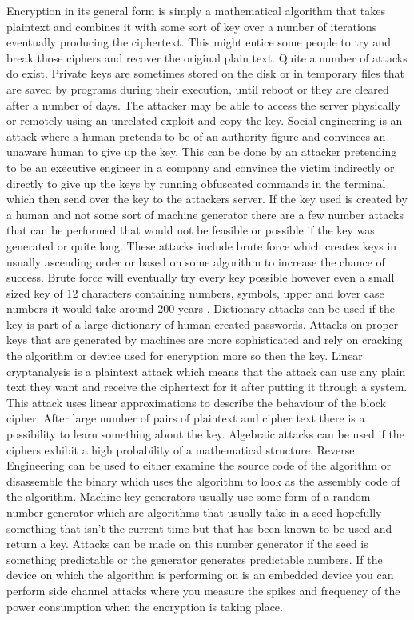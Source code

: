 Encryption in its general form is simply a mathematical algorithm that takes plaintext and combines it with some sort of key over a number of iterations eventually producing the ciphertext. This might entice some people to try and break those ciphers and recover the original plain text. Quite a number of attacks do exist.
Private keys are sometimes stored on the disk or in temporary files that are saved by programs during their execution, until reboot or they are cleared after a number of days. The attacker may be able to access the server physically or remotely using an unrelated exploit and copy the key.
Social engineering is an attack where a human pretends to be of an authority figure and convinces an unaware human to give up the key. This can be done by an attacker pretending to be an executive engineer in a company and convince the victim indirectly or directly to give up the keys by running obfuscated commands in the terminal which then send over the key to the attackers server.
If the key used is created by a human and not some sort of machine generator there are a few number attacks that can be performed that would not be feasible or possible if the key was generated or quite long. These attacks include brute force which creates keys in usually ascending order or based on some algorithm to increase the chance of success. Brute force will eventually try every key possible however even a small sized key of 12 characters containing numbers, symbols, upper and lover case numbers it would take around 200 years \cite{brute}. Dictionary attacks can be used if the key is part of a large dictionary of human created passwords. 
Attacks on proper keys that are generated by machines are more sophisticated and rely on cracking the algorithm or device used for encryption more so then the key.
Linear cryptanalysis \cite{cipher-attacks} is a plaintext attack which means that the attack can use any plain text they want and receive the ciphertext for it after putting it through a system. This attack uses linear approximations to describe the behaviour of the block cipher. After large number of pairs of plaintext and cipher text there is a possibility to learn something about the key.
Algebraic attacks \cite{cipher-attacks} can be used if the ciphers exhibit a high probability of a mathematical structure. 
Reverse Engineering \cite{cipher-attacks} can be used to either examine the source code of the algorithm or disassemble the binary which uses the algorithm to look as the assembly code of the algorithm.
Machine key generators usually use some form of a random number generator which are algorithms that usually take in a seed hopefully something that isn't the current time but that has been known to be used and return a key. Attacks can be made on this number generator if the seed is something predictable or the generator generates predictable numbers. 
If the device on which the algorithm is performing on is an embedded device you can perform side channel attacks \cite{cipher-attacks} where you measure the spikes and frequency of the power consumption when the encryption is taking place. 


